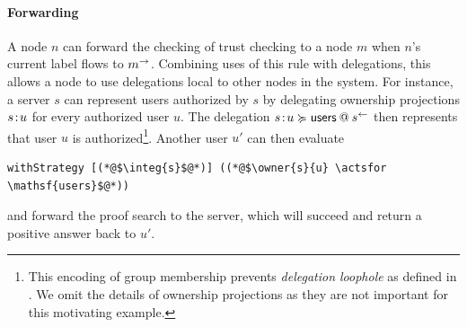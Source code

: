 \paragraph{Forwarding}
A node $n$ can forward the checking of trust checking to a node $m$ when $n$'s current label flows to $\conf{m}$. Combining uses of this rule with delegations, this allows a node to use delegations local to other nodes in the system. For instance, a server $s$ can represent users authorized by $s$ by delegating ownership projections $\owner{s}{u}$ for every authorized user $u$. The delegation $\lb{\integ{s}}{\owner{s}{u} \actsfor \mathsf{users}}$ then represents that user $u$ is authorized\footnote{This encoding of group membership prevents \emph{delegation loophole} as defined in \cite{Arden:2015:FA:2859845.2859998}. We omit the details of ownership projections as they are not important for this motivating example.}. Another user $u'$ can then evaluate
\begin{lstlisting}
withStrategy [(*@$\integ{s}$@*)] ((*@$\owner{s}{u} \actsfor \mathsf{users}$@*))
\end{lstlisting}
and forward the proof search to the server, which will succeed and return a positive answer back to $u'$.